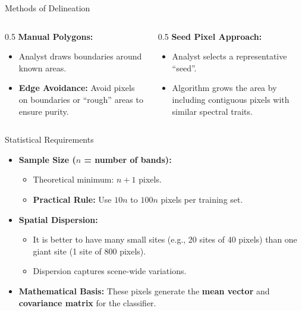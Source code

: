 \documentclass[aspectratio=169]{beamer}
\begin{document}
\begin{frame}{Methods of Delineation}
    \begin{columns}
        \begin{column}{0.5\textwidth}
            \textbf{Manual Polygons:}
            \begin{itemize}
                \item Analyst draws boundaries around known areas.
                \item \textbf{Edge Avoidance:} Avoid pixels on boundaries or ``rough'' areas to ensure purity.
            \end{itemize}
        \end{column}
        \begin{column}{0.5\textwidth}
            \textbf{Seed Pixel Approach:}
            \begin{itemize}
                \item Analyst selects a representative ``seed''.
                \item Algorithm grows the area by including contiguous pixels with similar spectral traits.
            \end{itemize}
        \end{column}
    \end{columns}
\end{frame}

\begin{frame}{Statistical Requirements}
    \begin{itemize}
        \item \textbf{Sample Size ($n$ = number of bands):}
        \begin{itemize}
            \item Theoretical minimum: $n + 1$ pixels.
            \item \textbf{Practical Rule:} Use $10n$ to $100n$ pixels per training set.
        \end{itemize}
        \item \textbf{Spatial Dispersion:}
        \begin{itemize}
            \item It is better to have many small sites (e.g., 20 sites of 40 pixels) than one giant site (1 site of 800 pixels).
            \item Dispersion captures scene-wide variations.
        \end{itemize}
        \item \textbf{Mathematical Basis:} These pixels generate the \textbf{mean vector} and \textbf{covariance matrix} for the classifier.
    \end{itemize}
\end{frame}
\end{document}
